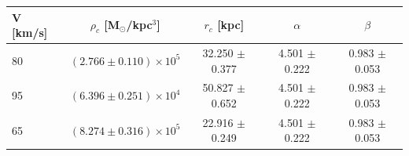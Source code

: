 \begin{tabular}{lcccc}
\toprule
V [km/s] & $\rho_c$ [M$_\odot$/kpc$^3$] & $r_c$ [kpc] & $\alpha$ & $\beta$ \\
\midrule
80 & $(2.766 \pm 0.110)\times10^{5}$ & 32.250 $\pm$ 0.377 & 4.501 $\pm$ 0.222 & 0.983 $\pm$ 0.053 \\
95 & $(6.396 \pm 0.251)\times10^{4}$ & 50.827 $\pm$ 0.652 & 4.501 $\pm$ 0.222 & 0.983 $\pm$ 0.053 \\
65 & $(8.274 \pm 0.316)\times10^{5}$ & 22.916 $\pm$ 0.249 & 4.501 $\pm$ 0.222 & 0.983 $\pm$ 0.053 \\
\bottomrule
\end{tabular}
